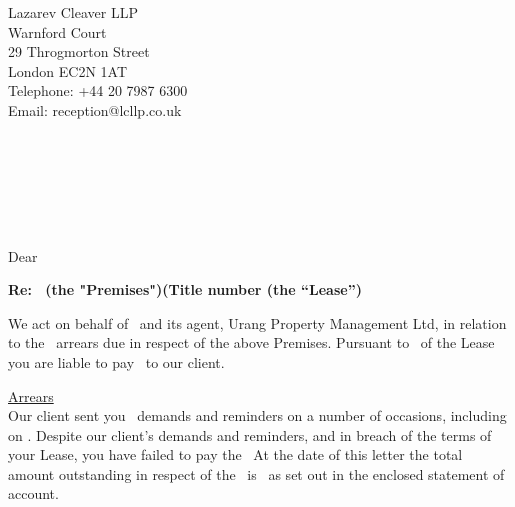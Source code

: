 \documentclass{article}
\begin{document}
\hspace*{\fill} Lazarev Cleaver LLP\\
\hspace*{\fill}Warnford Court\\
\hspace*{\fill}29 Throgmorton Street\\
\hspace*{\fill}London EC2N 1AT\\
\hspace*{\fill}Telephone: +44 20 7987 6300\\
\hspace*{\fill}Email: reception@lcllp.co.uk\par

\noindent\firstperson\\
\secondperson\\
\street\\
\locality\\
\town\\
\postcode\par
\vspace{5 mm}
\noindent\dateset\par
\vspace{3 mm}
\noindent\textbf{\sendmethod}\par
\vspace{3 mm}
\noindent Dear \borrower\par
\vspace{3 mm}
\noindent\textbf{Re: \property\ (the "Premises")\pone (Title number \tnumber (the “Lease”)}
\vspace{3 mm}
\par
\noindent We act on behalf of \propowner\ and its agent, Urang Property Management Ltd, in relation to the \charges\ arrears due in respect of the above Premises. Pursuant to \clause\ of the Lease you are
liable to pay \charges\ to our client.
\vspace{3 mm}
\par
\noindent\underline{Arrears}\\
Our client sent you \charges\ demands and reminders on a number of occasions, including on \demanddate. Despite our client’s demands and reminders, and in breach of the terms of your Lease, you have failed to pay the \charges\ At the date of this letter the total amount outstanding in respect of the \charges\ is \total\ as set out in the enclosed statement of account.
\vspace{3 mm}
\par
\interest
\newpage
\costs
\end{document}
